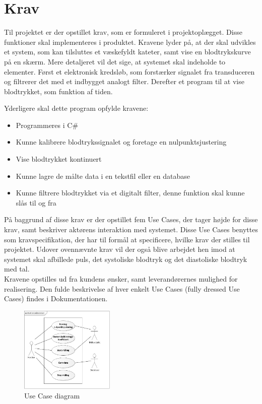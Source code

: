 \chapter{Krav}
Til projektet er der opstillet krav, som er formuleret i projektoplægget. Disse funktioner skal implementeres i produktet. Kravene lyder på, at der skal udvikles et system, som kan tilsluttes et væskefyldt kateter, samt vise en blodtrykskurve på en skærm. Mere detaljeret vil det sige, at systemet skal indeholde to elementer. Først et elektronisk kredsløb, som forstærker signalet fra transduceren og filtrerer det med et indbygget analogt filter. Derefter et program til at vise blodtrykket, som funktion af tiden.

Yderligere skal dette program opfylde kravene:
\begin{itemize}
\item Programmeres i C\#
\item Kunne kalibrere blodtrykssignalet og foretage en nulpunktsjustering
\item Vise blodtrykket kontinuert
\item Kunne lagre de målte data i en tekstfil eller en database
\item Kunne filtrere blodtrykket via et digitalt filter, denne funktion skal kunne slås til og fra
\end{itemize}

På baggrund af disse krav er der opstillet fem Use Cases, der tager højde for disse krav, samt beskriver aktørens interaktion med systemet. Disse Use Cases benyttes som kravspecifikation, der har til formål at specificere, hvilke krav der stilles til projektet. Udover ovennævnte krav vil der også blive arbejdet hen imod at systemet skal afbillede puls, det systoliske blodtryk og det diastoliske blodtryk med tal. \\
Kravene opstilles ud fra kundens ønsker, samt leverandørernes mulighed for realisering. Den fulde beskrivelse af hver enkelt Use Cases (fully dressed Use Cases) findes i Dokumentationen. 

\begin{figure}[H]
	\centering
	\includegraphics[width=0.4\textwidth]{Figurer/UseCasediagram}
	\caption{Use Case diagram}
	\label{fig:UC_diagram}
\end{figure}

